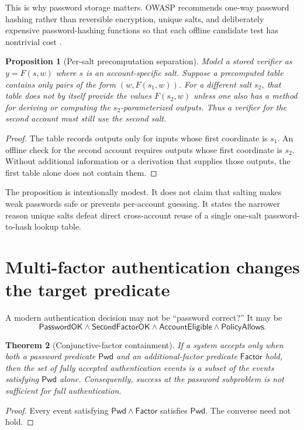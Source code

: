 \documentclass[11pt,openany]{book}
\newtheorem{theorem}{Theorem}[chapter]
\newtheorem{proposition}[theorem]{Proposition}
\theoremstyle{definition}
\theoremstyle{remark}
\begin{document}
This is why password storage matters. OWASP recommends one-way password hashing rather than reversible encryption, unique salts, and deliberately expensive password-hashing functions so that each offline candidate test has nontrivial cost \cite{OWASPPasswordStorage}.

\begin{proposition}[Per-salt precomputation separation]\label{thm:salt}
Model a stored verifier as $y=F(s,w)$ where $s$ is an account-specific salt. Suppose a precomputed table contains only pairs of the form $(w,F(s_1,w))$. For a different salt $s_2$, that table does not by itself provide the values $F(s_2,w)$ unless one also has a method for deriving or computing the $s_2$-parameterized outputs. Thus a verifier for the second account must still use the second salt.
\end{proposition}
\begin{proof}
The table records outputs only for inputs whose first coordinate is $s_1$. An offline check for the second account requires outputs whose first coordinate is $s_2$. Without additional information or a derivation that supplies those outputs, the first table alone does not contain them.
\end{proof}

The proposition is intentionally modest. It does not claim that salting makes weak passwords safe or prevents per-account guessing. It states the narrower reason unique salts defeat direct cross-account reuse of a single one-salt password-to-hash lookup table.

\section{Multi-factor authentication changes the target predicate}
A modern authentication decision may not be ``password correct?'' It may be
\[
\textsf{PasswordOK}\wedge\textsf{SecondFactorOK}\wedge\textsf{AccountEligible}\wedge\textsf{PolicyAllows}.
\]

\begin{theorem}[Conjunctive-factor containment]\label{thm:mfa}
If a system accepts only when both a password predicate $\mathsf{Pwd}$ and an additional-factor predicate $\mathsf{Factor}$ hold, then the set of fully accepted authentication events is a subset of the events satisfying $\mathsf{Pwd}$ alone. Consequently, success at the password subproblem is not sufficient for full authentication.
\end{theorem}
\begin{proof}
Every event satisfying $\mathsf{Pwd}\wedge\mathsf{Factor}$ satisfies $\mathsf{Pwd}$. The converse need not hold.
\end{proof}
\end{document}
